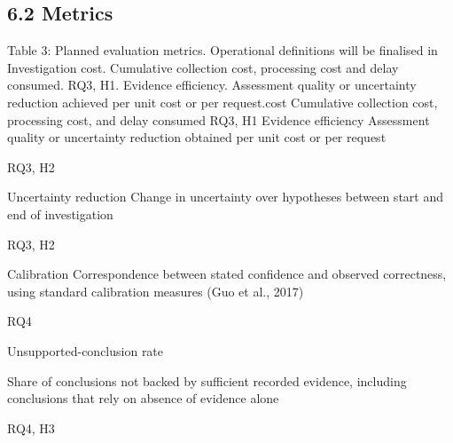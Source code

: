 \documentclass[a4paper,11pt]{article}
\begin{document}
\subsection{6.2 Metrics}
Table 3: Planned evaluation metrics. Operational definitions will be finalised in Investigation cost. Cumulative collection cost, processing cost and delay consumed. RQ3, H1. Evidence efficiency. Assessment quality or uncertainty reduction achieved per unit cost or per request.cost Cumulative collection cost, processing cost, and delay consumed RQ3, H1 Evidence efficiency Assessment quality or uncertainty reduction obtained per unit cost or per request\par
RQ3, H2\par
Uncertainty reduction Change in uncertainty over hypotheses between start and end of investigation\par
RQ3, H2\par
Calibration Correspondence between stated confidence and observed correctness, using standard calibration measures (Guo et al., 2017)\par
RQ4\par
Unsupported-conclusion rate\par
Share of conclusions not backed by sufficient recorded evidence, including conclusions that rely on absence of evidence alone\par
RQ4, H3\par
\end{document}
